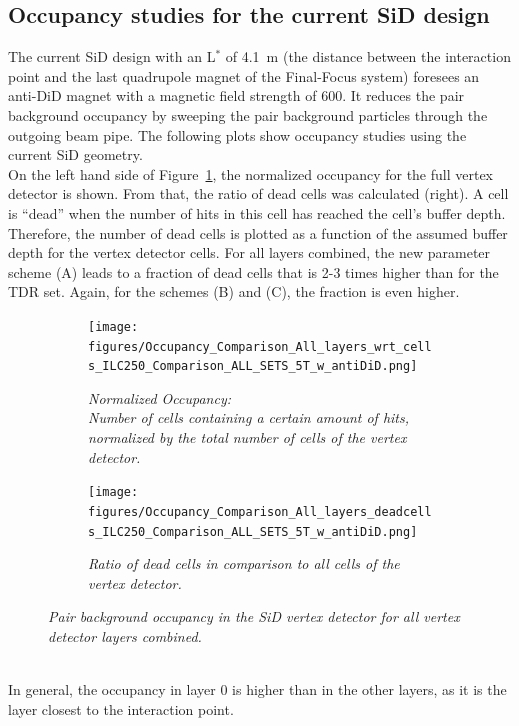\subsection{Occupancy studies for the current SiD design}
The current SiD design with an L$^*$ of \SI{4.1}{\meter} (the distance between the interaction point and the last quadrupole magnet of the Final-Focus system) foresees an anti-DiD magnet with a magnetic field strength of \SI{600}{\gauss}.
It reduces the pair background occupancy by sweeping the pair background particles through the outgoing beam pipe.
The following plots show occupancy studies using the current SiD geometry.\\
On the left hand side of Figure~\ref{fig:All_layers_Occupancy}, the normalized occupancy for the full vertex detector is shown.
From that, the ratio of dead cells was calculated (right).
A cell is ``dead'' when the number of hits in this cell has reached the cell's buffer depth.
Therefore, the number of dead cells is plotted as a function of the assumed buffer depth for the vertex detector cells.
For all layers combined, the new parameter scheme (A) leads to a fraction of dead cells that is 2-3 times higher than for the TDR set.
Again, for the schemes (B) and (C), the fraction is even higher.
\begin{figure}[!h]
\centering
\begin{subfigure}[t]{0.45\textwidth}
\centering
\texttt{[image: figures/Occupancy\_Comparison\_All\_layers\_wrt\_cells\_ILC250\_Comparison\_ALL\_SETS\_5T\_w\_antiDiD.png]}
\caption{\textit{Normalized Occupancy:\\Number of cells containing a certain amount of hits, normalized by the total number of cells of the vertex detector.}}
\end{subfigure}
\hspace*{0.3cm}
\begin{subfigure}[t]{0.45\textwidth}
\centering
\texttt{[image: figures/Occupancy\_Comparison\_All\_layers\_deadcells\_ILC250\_Comparison\_ALL\_SETS\_5T\_w\_antiDiD.png]}
\caption{\textit{Ratio of dead cells in comparison to all cells of the vertex detector.}}
\end{subfigure}
\caption{\textit{Pair background occupancy in the SiD vertex detector for all vertex detector layers combined.}}
\label{fig:All_layers_Occupancy}
\end{figure}
\\In general, the occupancy in layer 0 is higher than in the other layers, as it is the layer closest to the interaction point.
